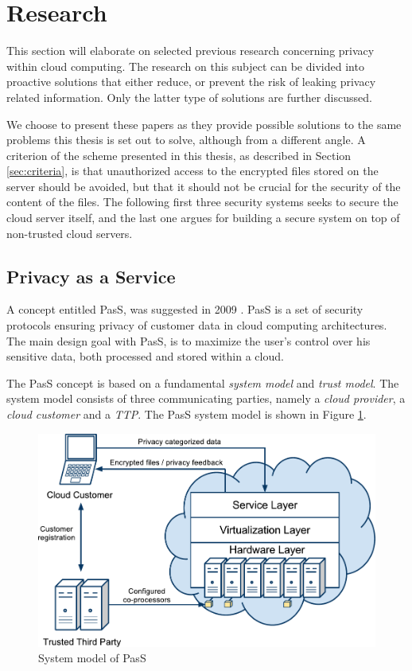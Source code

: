 \documentclass[pdftex,english,10pt,b5paper,twoside]{book}
\begin{document}
\section{Research}
\label{sec:research}

This section will elaborate on selected previous research concerning privacy
within cloud computing. The research on this subject can be divided into
proactive solutions that either reduce, or prevent the risk of leaking privacy
related information. Only the latter type of solutions are further discussed.

We choose to present these papers as they provide possible solutions to the
same problems this thesis is set out to solve, although from a different angle.
A criterion of the scheme presented in this thesis, as described in Section
\ref{sec:criteria}, is that unauthorized access to the encrypted files stored
on the server should be avoided, but that it should not be crucial for the
security of the content of the files. The following first three security
systems seeks to secure the cloud server itself, and the last one argues for
building a secure system on top of non-trusted cloud servers.

\subsection{Privacy as a Service}

A concept entitled \ac{PasS}, was suggested in 2009 \cite{PasS}. \ac{PasS} is a
set of security protocols ensuring privacy of customer data in cloud computing
architectures. The main design goal with \ac{PasS}, is to maximize the user's
control over his sensitive data, both processed and stored within a cloud.

The \ac{PasS} concept is based on a fundamental \emph{system model} and
\emph{trust model}. The system model consists of three communicating parties,
namely a \emph{cloud provider}, a \emph{cloud customer} and a \emph{\ac{TTP}}.
The \ac{PasS} system model is shown in Figure \ref{fig:RW:PasS}.

\begin{figure}[h!]
    \centering
    \includegraphics[scale=0.6]{ArchitecturePasS.pdf}
    \caption{System model of PasS}
    \label{fig:RW:PasS}
\end{figure}
\end{document}
